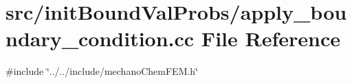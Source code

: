 \section{src/init\+Bound\+Val\+Probs/apply\+\_\+boundary\+\_\+condition.cc File Reference}
\label{apply__boundary__condition_8cc}
{\ttfamily \#include \char`\"{}../../include/mechano\+Chem\+F\+E\+M.\+h\char`\"{}}\newline
